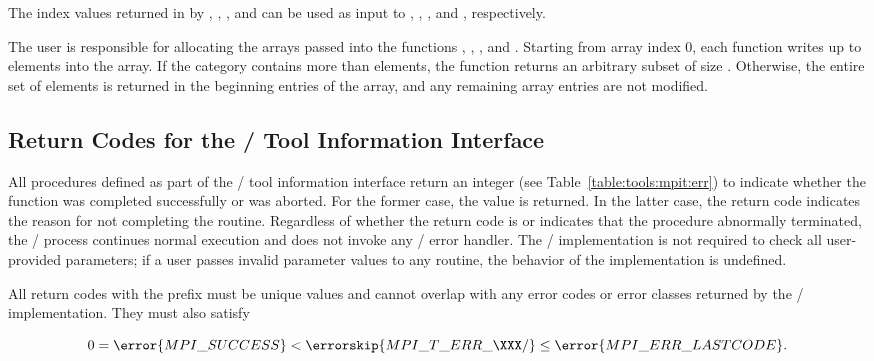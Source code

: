 The index values returned in  by
,
,
, and
 can be used as input to
, ,
, and
, respectively.

The user is responsible for allocating the arrays passed into the functions
,
,
, and
.  Starting from array index
$0$, each function writes up to  elements into the array.  If
the category contains more than  elements, the function returns
an arbitrary subset of size .  Otherwise, the entire set of elements is
returned in the beginning entries of the array, and any remaining array
entries are not modified.

\subsection{Return Codes for the \texorpdfstring{\MPI/}{MPI} Tool Information Interface}
\label{sec:mpit:retcodes}

All procedures defined as part of the \MPI/ tool information interface
return an integer %
%
 (see Table~\ref{table:tools:mpit:err}) to
indicate whether the function was completed successfully or was aborted.
For the former case, the value  is returned.
In the latter case, the return code indicates the reason for not completing
the routine.  Regardless of whether the return code is  or indicates that the procedure abnormally terminated, the \MPI/ process continues normal execution and does not invoke any \MPI/ error handler.   The \MPI/ implementation is
not required to check all user-provided parameters; if a user passes
invalid parameter values to any routine, the behavior of the implementation
is undefined.

All return codes with the prefix  must be unique values and
cannot overlap with any error codes or error classes returned by the
\MPI/ implementation.  They must also satisfy

$$
0 = \error{MPI\_SUCCESS} < \errorskip{MPI\_T\_ERR\_\XXX/} \leq \error{MPI\_ERR\_LASTCODE}.
$$

